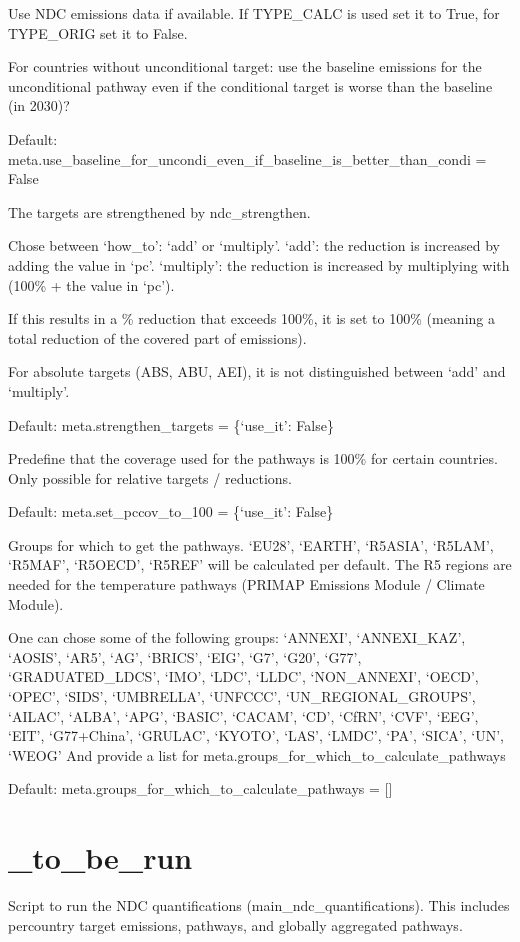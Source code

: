 \documentclass[letterpaper,10pt,english]{sphinxmanual}
\begin{document}
Use NDC emissions data if available.
If TYPE\_CALC is used set it to True, for TYPE\_ORIG set it to False.

For countries without unconditional target: use the baseline emissions for the unconditional
pathway even if the conditional target is worse than the baseline (in 2030)?

Default:
meta.use\_baseline\_for\_uncondi\_even\_if\_baseline\_is\_better\_than\_condi = False

The targets are strengthened by ndc\_strengthen.

Chose between ‘how\_to’: ‘add’ or ‘multiply’.
‘add’: the reduction is increased by adding the value in ‘pc’.
‘multiply’: the reduction is increased by multiplying with (100\% + the value in ‘pc’).

If this results in a \% reduction that exceeds 100\%, it is set to 100\% (meaning a total
reduction of the covered part of emissions).

For absolute targets (ABS, ABU, AEI), it is not distinguished between ‘add’ and ‘multiply’.

Default:
meta.strengthen\_targets = \{‘use\_it’: False\}

Predefine that the coverage used for the pathways is 100\% for certain countries.
Only possible for relative targets / reductions.

Default:
meta.set\_pccov\_to\_100 = \{‘use\_it’: False\}

Groups for which to get the pathways.
‘EU28’, ‘EARTH’, ‘R5ASIA’, ‘R5LAM’, ‘R5MAF’, ‘R5OECD’, ‘R5REF’ will be calculated per default.
The R5 regions are needed for the temperature pathways (PRIMAP Emissions Module / Climate Module).

One can chose some of the following groups:
‘ANNEXI’, ‘ANNEXI\_KAZ’, ‘AOSIS’, ‘AR5’, ‘AG’, ‘BRICS’, ‘EIG’, ‘G7’, ‘G20’, ‘G77’,
‘GRADUATED\_LDCS’, ‘IMO’, ‘LDC’, ‘LLDC’, ‘NON\_ANNEXI’, ‘OECD’, ‘OPEC’, ‘SIDS’,
‘UMBRELLA’, ‘UNFCCC’, ‘UN\_REGIONAL\_GROUPS’, ‘AILAC’, ‘ALBA’, ‘APG’, ‘BASIC’, ‘CACAM’, ‘CD’,
‘CfRN’, ‘CVF’, ‘EEG’, ‘EIT’, ‘G77+China’, ‘GRULAC’, ‘KYOTO’, ‘LAS’, ‘LMDC’, ‘PA’,
‘SICA’, ‘UN’, ‘WEOG’
And provide a list for
meta.groups\_for\_which\_to\_calculate\_pathways

Default:
meta.groups\_for\_which\_to\_calculate\_pathways = {[}{]}


\chapter{\_to\_be\_run}
\label{\detokenize{code:to-be-run}}
Script to run the NDC quantifications (main\_ndc\_quantifications).
This includes per\sphinxhyphen{}country target emissions, pathways, and globally aggregated pathways.
\end{document}
